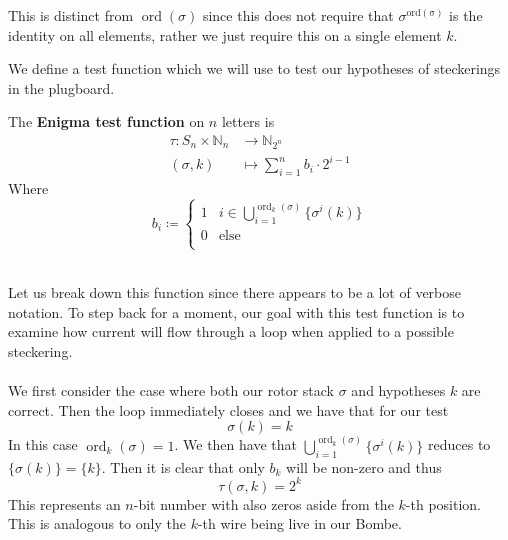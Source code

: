 This is distinct from $\operatorname{ord}(\sigma)$ since this does not require that $\sigma^{\operatorname{ord(\sigma)}}$ is the identity on all elements, 
rather we just require this on a single element $k$.

We define a test function which we will use to test our hypotheses of steckerings in the plugboard. 

\begin{definition}
    The \textbf{Enigma test function} on $n$ letters is 
    \begin{align*}
        \tau: S_n\times \mathbb{N}_n & \to \mathbb{N}_{2^n}
        \\(\sigma, k) &\mapsto \sum_{i=1}^{n}b_i\cdot 2^{i-1}
    \end{align*}
    Where
    \[
      b_i \coloneq 
      \begin{cases} 
      1 & i\in\bigcup\limits_{i=1}^{\operatorname{ord}_k(\sigma)}\{\sigma^i(k)\}\\
      0 & \text{else} \\
      \end{cases}
    \]
\end{definition}
\text{}\\Let us break down this function since there appears to be a lot of verbose notation. To step back for a moment, our goal
with this test function is to examine how current will flow through a loop when applied to a possible steckering. 
\\\\We first consider the case where both our rotor stack $\sigma$ and hypotheses $k$ are correct. Then the loop immediately closes and 
we have that for our test
    \[
        \sigma(k) = k
    \]
In this case $\operatorname{ord}_k(\sigma) = 1$. We then have that $\bigcup\limits_{i=1}^{\operatorname{ord}_k(\sigma)}\{\sigma^i(k)\}$ reduces to $\{\sigma(k)\} = \{k\}$.
Then it is clear that only $b_k$ will be non-zero and thus
\[
    \tau(\sigma, k) = 2^k
\]
This represents an $n$-bit number with also zeros aside from the $k$-th position. This is analogous to only the $k$-th wire being live in our Bombe. 